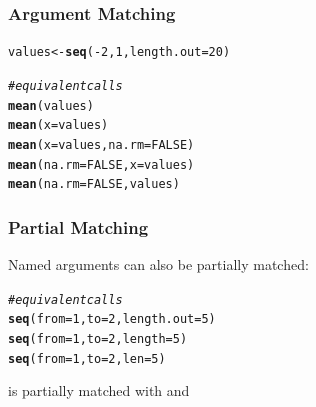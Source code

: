 \documentclass[12pt]{beamer}\usepackage[]{graphicx}\usepackage[]{color}
\makeatletter
\newcommand{\hlnum}[1]{\textcolor[rgb]{0.686,0.059,0.569}{#1}}%
\newcommand{\hlcom}[1]{\textcolor[rgb]{0.678,0.584,0.686}{\textit{#1}}}%
\newcommand{\hlopt}[1]{\textcolor[rgb]{0,0,0}{#1}}%
\newcommand{\hlstd}[1]{\textcolor[rgb]{0.345,0.345,0.345}{#1}}%
\newcommand{\hlkwb}[1]{\textcolor[rgb]{0.69,0.353,0.396}{#1}}%
\newcommand{\hlkwc}[1]{\textcolor[rgb]{0.333,0.667,0.333}{#1}}%
\newcommand{\hlkwd}[1]{\textcolor[rgb]{0.737,0.353,0.396}{\textbf{#1}}}%
\newenvironment{kframe}{%
 \def\at@end@of@kframe{}%
 \ifinner\ifhmode%
  \def\at@end@of@kframe{\end{minipage}}%
  \begin{minipage}{\columnwidth}%
 \fi\fi%
 \def\FrameCommand##1{\hskip\@totalleftmargin \hskip-\fboxsep
 \colorbox{shadecolor}{##1}\hskip-\fboxsep
     \hskip-\linewidth \hskip-\@totalleftmargin \hskip\columnwidth}%
 \MakeFramed {\advance\hsize-\width
   \@totalleftmargin\z@ \linewidth\hsize
   \@setminipage}}%
 {\par\unskip\endMakeFramed%
 \at@end@of@kframe}
\newenvironment{knitrout}{}{} %
\makeatother
\begin{document}
\begin{frame}[fragile]
\frametitle{Argument Matching}

\begin{knitrout}\footnotesize
{}\color{fgcolor}\begin{kframe}
\begin{alltt}
\hlstd{values} \hlkwb{<-} \hlkwd{seq}\hlstd{(}\hlopt{-}\hlnum{2}\hlstd{,} \hlnum{1}\hlstd{,} \hlkwc{length.out} \hlstd{=} \hlnum{20}\hlstd{)}

\hlcom{# equivalent calls}
\hlkwd{mean}\hlstd{(values)}
\hlkwd{mean}\hlstd{(}\hlkwc{x} \hlstd{= values)}
\hlkwd{mean}\hlstd{(}\hlkwc{x} \hlstd{= values,} \hlkwc{na.rm} \hlstd{=} \hlnum{FALSE}\hlstd{)}
\hlkwd{mean}\hlstd{(}\hlkwc{na.rm} \hlstd{=} \hlnum{FALSE}\hlstd{,} \hlkwc{x} \hlstd{= values)}
\hlkwd{mean}\hlstd{(}\hlkwc{na.rm} \hlstd{=} \hlnum{FALSE}\hlstd{, values)}
\end{alltt}
\end{kframe}
\end{knitrout}

\end{frame}


\begin{frame}[fragile]
\frametitle{Partial Matching}

Named arguments can also be partially matched:
\begin{knitrout}\footnotesize
{}\color{fgcolor}\begin{kframe}
\begin{alltt}
\hlcom{# equivalent calls}
\hlkwd{seq}\hlstd{(}\hlkwc{from} \hlstd{=} \hlnum{1}\hlstd{,} \hlkwc{to} \hlstd{=} \hlnum{2}\hlstd{,} \hlkwc{length.out} \hlstd{=} \hlnum{5}\hlstd{)}
\hlkwd{seq}\hlstd{(}\hlkwc{from} \hlstd{=} \hlnum{1}\hlstd{,} \hlkwc{to} \hlstd{=} \hlnum{2}\hlstd{,} \hlkwc{length} \hlstd{=} \hlnum{5}\hlstd{)}
\hlkwd{seq}\hlstd{(}\hlkwc{from} \hlstd{=} \hlnum{1}\hlstd{,} \hlkwc{to} \hlstd{=} \hlnum{2}\hlstd{,} \hlkwc{len} \hlstd{=} \hlnum{5}\hlstd{)}
\end{alltt}
\end{kframe}
\end{knitrout}

 is partially matched with  and 

\end{frame}
\end{document}
